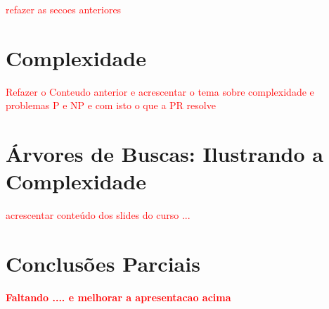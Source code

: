 \textcolor{red}{refazer as secoes anteriores}


\section{Complexidade}


\textcolor{red}{Refazer o Conteudo anterior e acrescentar o tema sobre complexidade e problemas P e NP e com isto o que a PR resolve}

\section{Árvores de Buscas: Ilustrando a Complexidade}

\textcolor{red}{acrescentar conteúdo dos slides do curso ... }



\section{Conclusões Parciais}
{\bf \textcolor{red}{Faltando .... e melhorar a apresentacao acima}}
